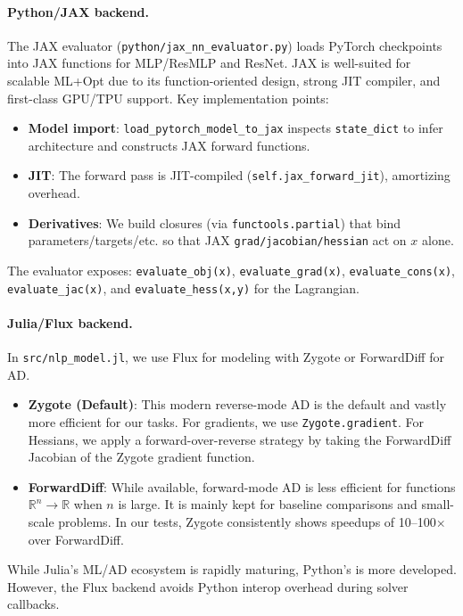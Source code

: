 \documentclass[11pt]{article}
\begin{document}
\paragraph{Python/JAX backend.} The JAX evaluator (\texttt{python/jax\_nn\_evaluator.py}) loads PyTorch checkpoints into JAX functions for MLP/ResMLP and ResNet. JAX is well-suited for scalable ML+Opt due to its function-oriented design, strong JIT compiler, and first-class GPU/TPU support. Key implementation points:
\begin{itemize}[leftmargin=1.5em]
  \item \textbf{Model import}: \texttt{load\_pytorch\_model\_to\_jax} inspects \texttt{state\_dict} to infer architecture and constructs JAX forward functions.
  \item \textbf{JIT}: The forward pass is JIT-compiled (\texttt{self.jax\_forward\_jit}), amortizing overhead.
  \item \textbf{Derivatives}: We build closures (via \texttt{functools.partial}) that bind parameters/targets/etc. so that JAX \texttt{grad/jacobian/hessian} act on $x$ alone.
\end{itemize}
The evaluator exposes: \texttt{evaluate\_obj(x)}, \texttt{evaluate\_grad(x)}, \texttt{evaluate\_cons(x)}, \texttt{evaluate\_jac(x)}, and \texttt{evaluate\_hess(x,y)} for the Lagrangian.

\paragraph{Julia/Flux backend.} In \texttt{src/nlp\_model.jl}, we use Flux for modeling with Zygote or ForwardDiff for AD.
\begin{itemize}[leftmargin=1.5em]
  \item \textbf{Zygote (Default)}: This modern reverse-mode AD is the default and vastly more efficient for our tasks. For gradients, we use \texttt{Zygote.gradient}. For Hessians, we apply a forward-over-reverse strategy by taking the ForwardDiff Jacobian of the Zygote gradient function.
  \item \textbf{ForwardDiff}: While available, forward-mode AD is less efficient for functions $\mathbb{R}^n \to \mathbb{R}$ when $n$ is large. It is mainly kept for baseline comparisons and small-scale problems. In our tests, Zygote consistently shows speedups of 10--100$\times$ over ForwardDiff.
\end{itemize}
While Julia's ML/AD ecosystem is rapidly maturing, Python's is more developed. However, the Flux backend avoids Python interop overhead during solver callbacks.
\end{document}
